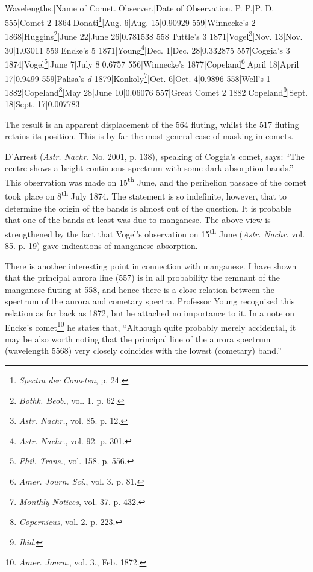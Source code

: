 \documentclass[a4paper, 12pt, oneside, polutonikogreek, english]{article}
\begin{document}
Wavelengths.|Name of Comet.|Observer.|Date of Observation.|P. P.|P. D. 
555|Comet 2 1864|Donati\footnote{\emph{Spectra der Cometen}, p. 24.}|Aug. 6|Aug. 15|0.90929 
559|Winnecke's 2 1868|Huggins\footnote{\emph{Bothk. Beob.}, vol. 1. p. 62.}|June 22|June 26|0.781538 
558|Tuttle's 3 1871|Vogel\footnote{\emph{Astr. Nachr.}, vol. 85. p. 12.}|Nov. 13|Nov. 30|1.03011 
559|Encke's 5 1871|Young\footnote{\emph{Astr. Nachr.}, vol. 92. p. 301.}|Dec. 1|Dec. 28|0.332875 
557|Coggia's 3 1874|Vogel\footnote{\emph{Phil. Trans.}, vol. 158. p. 556.}|June 7|July 8|0.6757 
556|Winnecke's 1877|Copeland\footnote{\emph{Amer. Journ. Sci.}, vol. 3. p. 81.}|April 18|April 17|0.9499 
559|Palisa's \emph{d} 1879|Konkoly\footnote{\emph{Monthly Notices}, vol. 37. p. 432.}|Oct. 6|Oct. 4|0.9896 
558|Well's 1 1882|Copeland\footnote{\emph{Copernicus}, vol. 2. p. 223.}|May 28|June 10|0.06076 
557|Great Comet 2 1882|Copeland\footnote{\emph{Ibid.}}|Sept. 18|Sept. 17|0.007783

The result is an apparent displacement of the 564 fluting, whilst the 517 fluting retains its position. This is by far the most general case of masking in comets.

D'Arrest (\emph{Astr. Nachr.} No. 2001, p. 138), speaking of Coggia's comet, says: ``The centre shows a bright continuous spectrum with some dark absorption bands.'' This observation was made on 15\textsuperscript{th} June, and the perihelion passage of the comet took place on 8\textsuperscript{th} July 1874. The statement is so indefinite, however, that to determine the origin of the bands is almost out of the question. It is probable that one of the bands at least was due to manganese. The above view is strengthened by the fact that Vogel's observation on 15\textsuperscript{th} June (\emph{Astr. Nachr.} vol. 85. p. 19) gave indications of manganese absorption.

There is another interesting point in connection with manganese. I have shown that the principal aurora line (557) is in all probability the remnant of the manganese fluting at 558, and hence there is a close relation between the spectrum of the aurora and cometary spectra. Professor Young recognised this relation as far back as 1872, but he attached no importance to it. In a note on Encke's comet\footnote{\emph{Amer. Journ.}, vol. 3., Feb. 1872.} he states that, ``Although quite probably merely accidental, it may be also worth noting that the principal line of the aurora spectrum (wavelength 5568) very closely coincides with the lowest (cometary) band.''
\end{document}
